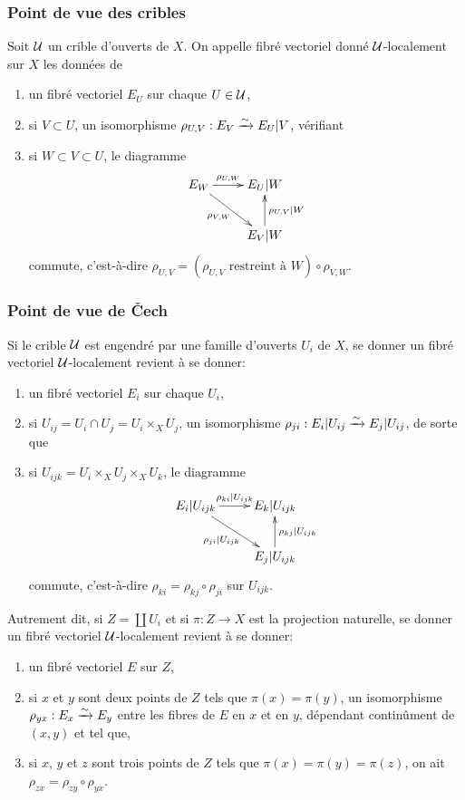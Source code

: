 \documentclass[oneside]{book}
\begin{document}
\subsubsection{Point de vue des cribles}\label{I:1-3-1}

Soit $\mathcal{U}$ un crible d'ouverts de $X$. On appelle fibré vectoriel donné 
$\mathcal{U}$-localement sur $X$ les données de 
\begin{enumerate}[\indent a)]
  \item un fibré vectoriel $E_U$ sur chaque $U\in \mathcal{U}$, 
  \item si $V\subset U$, un isomorphisme $\rho_{U,V} : E_V\xrightarrow\sim E_U|V$, vérifiant 
  \item si $W\subset V\subset U$, le diagramme 
    \[\xymatrix{
      E_W \ar[r]^-{\rho_{U,W}} \ar[dr]_-{\rho_{V,W}}
        & E_U|W \\
      & E_V|W \ar[u]_-{\rho_{U,V}|W}
    }\]
    commute, c'est-à-dire 
    $\rho_{U,V} = (\mbox{$\rho_{U,V}$ restreint à $W$}) \circ \rho_{V,W}$. 
\end{enumerate}





\subsubsection{Point de vue de Čech}\label{I:1-3-2}

Si le crible $\mathcal{U}$ est engendré par une famille d'ouverts $U_i$ de $X$, se 
donner un fibré vectoriel $\mathcal{U}$-localement revient à se donner:
\begin{enumerate}[\indent a)]
  \item un fibré vectoriel $E_i$ sur chaque $U_i$, 
  \item si $U_{ij} = U_i\cap U_j = U_i\times_X U_j$, un isomorphisme 
    $\rho_{ji} : E_i|U_{ij} \xrightarrow\sim E_j|U_{ij}$, de sorte que 
  \item si $U_{ijk} = U_i\times_X U_j\times_X U_k$, le diagramme 
    \[\xymatrix{
      E_i |U_{ijk} \ar[r]^-{\rho_{ki}|U_{ijk}} \ar[dr]_-{\rho_{ji}|U_{ijk}} 
        & E_k|U_{ijk} \\
      & E_j|U_{ijk} \ar[u]_-{\rho_{kj}|U_{ijk}}
    }\]
    commute, c'est-à-dire $\rho_{ki} = \rho_{kj}\circ \rho_{ji}$ sur 
    $U_{ijk}$. 
\end{enumerate}

Autrement dit, si $Z=\coprod U_i$ et si $\pi:Z\to X$ est la projection 
naturelle, se donner un fibré vectoriel $\mathcal{U}$-localement revient à se donner: 
\begin{enumerate}[\indent a)]
  \item un fibré vectoriel $E$ sur $Z$, 
  \item si $x$ et $y$ sont deux points de $Z$ tels que $\pi(x) = \pi(y)$, un 
    isomorphisme $\rho_{y x}:E_x\xrightarrow\sim E_y$ entre les fibres de $E$ en $x$ et en 
    $y$, dépendant continûment de $(x,y)$ et tel que, 
  \item si $x$, $y$ et $z$ sont trois points de $Z$ tels que 
  $\pi(x)=\pi(y)=\pi(z)$, on ait $\rho_{zx} = \rho_{zy}\circ \rho_{yx}$. 
\end{enumerate}
\end{document}
